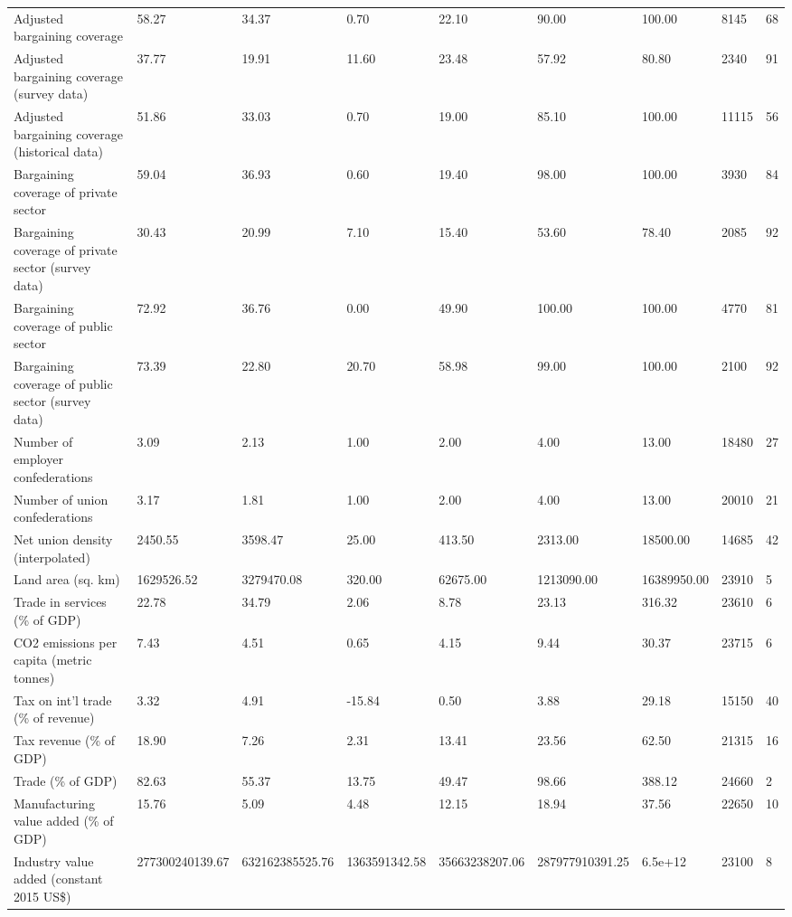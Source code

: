 \begin{longtable}{lllllllll}
Adjusted bargaining coverage & 58.27 & 34.37 & 0.70 & 22.10 & 90.00 & 100.00 & 8145 & 68\\
\addlinespace
Adjusted bargaining coverage (survey data) & 37.77 & 19.91 & 11.60 & 23.48 & 57.92 & 80.80 & 2340 & 91\\
Adjusted bargaining coverage (historical data) & 51.86 & 33.03 & 0.70 & 19.00 & 85.10 & 100.00 & 11115 & 56\\
Bargaining coverage of private sector & 59.04 & 36.93 & 0.60 & 19.40 & 98.00 & 100.00 & 3930 & 84\\
Bargaining coverage of private sector (survey data) & 30.43 & 20.99 & 7.10 & 15.40 & 53.60 & 78.40 & 2085 & 92\\
Bargaining coverage of public sector & 72.92 & 36.76 & 0.00 & 49.90 & 100.00 & 100.00 & 4770 & 81\\
\addlinespace
Bargaining coverage of public sector (survey data) & 73.39 & 22.80 & 20.70 & 58.98 & 99.00 & 100.00 & 2100 & 92\\
Number of employer confederations & 3.09 & 2.13 & 1.00 & 2.00 & 4.00 & 13.00 & 18480 & 27\\
Number of union confederations & 3.17 & 1.81 & 1.00 & 2.00 & 4.00 & 13.00 & 20010 & 21\\
Net union density (interpolated) & 2450.55 & 3598.47 & 25.00 & 413.50 & 2313.00 & 18500.00 & 14685 & 42\\
Land area (sq. km) & 1629526.52 & 3279470.08 & 320.00 & 62675.00 & 1213090.00 & 16389950.00 & 23910 & 5\\
\addlinespace
Trade in services (\% of GDP) & 22.78 & 34.79 & 2.06 & 8.78 & 23.13 & 316.32 & 23610 & 6\\
CO2 emissions per capita (metric tonnes) & 7.43 & 4.51 & 0.65 & 4.15 & 9.44 & 30.37 & 23715 & 6\\
Tax on int'l trade (\% of revenue) & 3.32 & 4.91 & -15.84 & 0.50 & 3.88 & 29.18 & 15150 & 40\\
Tax revenue (\% of GDP) & 18.90 & 7.26 & 2.31 & 13.41 & 23.56 & 62.50 & 21315 & 16\\
Trade (\% of GDP) & 82.63 & 55.37 & 13.75 & 49.47 & 98.66 & 388.12 & 24660 & 2\\
\addlinespace
Manufacturing value added (\% of GDP) & 15.76 & 5.09 & 4.48 & 12.15 & 18.94 & 37.56 & 22650 & 10\\
Industry value added (constant 2015 US\$) & 277300240139.67 & 632162385525.76 & 1363591342.58 & 35663238207.06 & 287977910391.25 & 6.5e+12 & 23100 & 8\\

\end{longtable}
